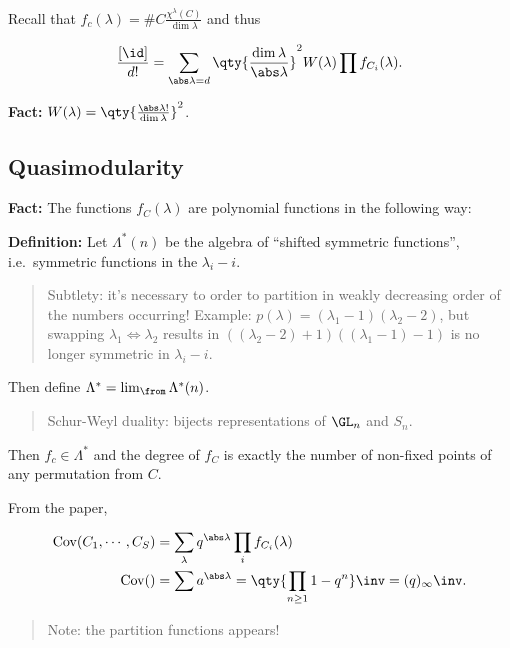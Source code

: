 Recall that \(f_c(\lambda) = \# C \frac{\chi^\lambda(C)}{\dim \lambda}\)
and thus

\begin{align*}
\frac{[\id]}{d!} = \sum_{\abs \lambda = d} \qty{\frac{\dim \lambda}{\abs \lambda}}^2 W(\lambda) \prod f_{C_i}(\lambda)
.\end{align*}

\textbf{Fact:}
\(W(\lambda) = \qty{\frac{\abs \lambda !}{\dim \lambda}}^2\).

\hypertarget{quasimodularity}{%
\subsection{Quasimodularity}\label{quasimodularity}}

\textbf{Fact:} The functions \(f_C(\lambda)\) are polynomial functions
in the following way:

\textbf{Definition:} Let \(\Lambda^*(n)\) be the algebra of ``shifted
symmetric functions'', i.e.~symmetric functions in the
\(\lambda_i - i\).

\begin{quote}
Subtlety: it's necessary to order to partition in weakly decreasing
order of the numbers occurring! Example:
\(p(\lambda) = (\lambda_1 - 1)(\lambda_2 - 2)\), but swapping
\(\lambda_1 \iff \lambda_2\) results in
\(((\lambda_2 - 2) + 1)((\lambda_1 - 1) - 1)\) is no longer symmetric in
\(\lambda_i - i\).
\end{quote}

Then define \(\Lambda^* = \lim_{\from} \Lambda^*(n)\).

\begin{quote}
Schur-Weyl duality: bijects representations of \(\GL_n\) and \(S_n\).
\end{quote}

Then \(f_c \in \Lambda^*\) and the degree of \(f_C\) is exactly the
number of non-fixed points of any permutation from \(C\).

From the paper,

\begin{align*}
\mathrm{Cov}(C_1, \cdots, C_S) &= \sum_\lambda q^{\abs \lambda} \prod_i f_{C_i}(\lambda) \\
\mathrm{Cov}() &= \sum a^{\abs \lambda} = \qty{ \prod_{n\geq 1} 1-q^n }\inv = (q)_\infty\inv
.\end{align*}

\begin{quote}
Note: the partition functions appears!
\end{quote}

